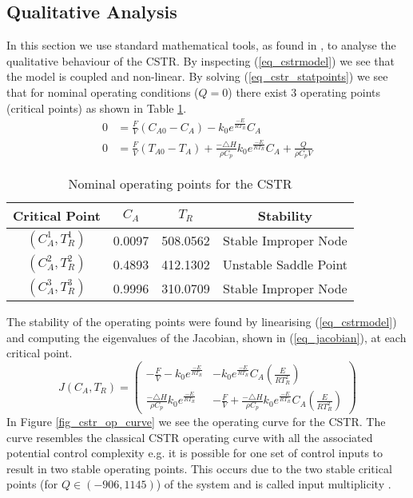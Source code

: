 \subsection{Qualitative Analysis}
In this section we use standard mathematical tools, as found in \cite{edwardsandpenny}, to analyse the qualitative behaviour of the CSTR. By inspecting (\ref{eq_cstrmodel}) we see that the model is coupled and non-linear. By solving (\ref{eq_cstr_statpoints}) we see that for nominal operating conditions ($Q = 0$) there exist 3 operating points (critical points) as shown in Table \ref{tab_nominalstats}.
\begin{equation}
\begin{aligned}
0&= \frac{F}{V}\left( C_{A0}-C_A \right) - k_0e^{\frac{-E}{RT_R}}C_A \\
0 &= \frac{F}{V}\left(T_{A0}-T_A\right) + \frac{-\triangle H}{\rho C_p}k_0e^{\frac{-E}{RT_R}}C_A + \frac{Q}{\rho C_p V}
\end{aligned}
\label{eq_cstr_statpoints}
\end{equation}
\begin{table}[H]
\begin{center}
\begin{tabular}{c c c c}
\hline
Critical Point & $C_A$ & $T_R$ & Stability\\
\hline
$\left(C_A^1, T_R^1\right)$ & 0.0097 & 508.0562 & Stable Improper Node\\
$\left(C_A^2, T_R^2\right)$ & 0.4893 & 412.1302 & Unstable Saddle Point \\
$\left(C_A^3, T_R^3 \right)$ & 0.9996 & 310.0709 & Stable Improper Node \\
\hline
\end{tabular}
\caption{Nominal operating points for  the CSTR}
\label{tab_nominalstats}
\end{center}
\end{table}
The stability of the operating points were found by linearising (\ref{eq_cstrmodel}) and computing the eigenvalues of the Jacobian, shown in (\ref{eq_jacobian}), at each critical point.
\begin{equation}
J(C_A, T_R) = \begin{pmatrix}
-\frac{F}{V} - k_0e^{\frac{-E}{RT_R}} & - k_0e^{\frac{-E}{RT_R}}C_A\left(\frac{E}{RT_R^2}\right) \\
\frac{-\triangle H}{\rho C_p}k_0e^{\frac{-E}{RT_R}} & -\frac{F}{V} + \frac{-\triangle H}{\rho C_p}k_0e^{\frac{-E}{RT_R}}C_A\left(\frac{E}{RT_R^2}\right) 
\end{pmatrix}
\label{eq_jacobian}
\end{equation}
In Figure \ref{fig_cstr_op_curve} we see the operating curve for the CSTR. The curve resembles the classical CSTR operating curve with all the associated potential control complexity e.g. it is possible for one set of control inputs to result in two stable operating points. This occurs due to the two stable critical points (for $Q\in (-906, 1145)$) of the system and is called input multiplicity \cite{luyben}. 

